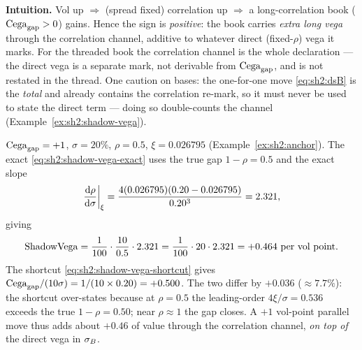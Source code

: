 \textbf{Intuition.} Vol up $\Rightarrow$ (spread fixed) correlation up
$\Rightarrow$ a long-correlation book ($\mathrm{Cega}_{\mathrm{gap}} > 0$) gains. Hence the sign
is \emph{positive}: the book carries \emph{extra long vega} through the
correlation channel, additive to whatever direct (fixed-$\rho$) vega it
marks. For the threaded book the correlation channel is the whole
declaration --- the direct vega is a separate mark, not derivable from
$\mathrm{Cega}_{\mathrm{gap}}$, and is not restated in the thread. One caution on bases: the
one-for-one move \eqref{eq:sh2:dsB} is the \stickycvc{} \emph{total} and
already contains the correlation re-mark, so it must never be used to
state the direct term --- doing so double-counts the channel
(Example~\ref{ex:sh2:shadow-vega}).

\begin{example}\label{ex:sh2:shadow-vega}
$\mathrm{Cega}_{\mathrm{gap}} = +1$, $\sigma = 20\%$, $\rho = 0.5$, $\xi = 0.026795$
(Example~\ref{ex:sh2:anchor}). The exact
\eqref{eq:sh2:shadow-vega-exact} uses the true gap $1 - \rho = 0.5$ and the
exact slope
\[
  \left.\frac{\mathrm{d} \rho}{\mathrm{d} \sigma}\right|_{\xi}
  = \frac{4 (0.026795)(0.20 - 0.026795)}{0.20^3} = 2.321,
\]
giving
\[
  \mathrm{ShadowVega} = \frac{1}{100} \cdot \frac{10}{0.5} \cdot 2.321
          = \frac{1}{100} \cdot 20 \cdot 2.321
          = +0.464 \ \text{per vol point}.
\]
The shortcut \eqref{eq:sh2:shadow-vega-shortcut} gives
$\mathrm{Cega}_{\mathrm{gap}}/(10\sigma) = 1/(10 \times 0.20) = +0.500$. The two differ by
$+0.036$ ($\approx 7.7\%$): the shortcut over-states because at
$\rho = 0.5$ the leading-order $4\xi/\sigma = 0.536$ exceeds the true
$1 - \rho = 0.50$; near $\rho \approx 1$ the gap closes. A $+1$ vol-point
parallel move thus adds about $+0.46$ of value through the correlation
channel, \emph{on top of} the direct vega in $\sigma_B$.


\end{example}
